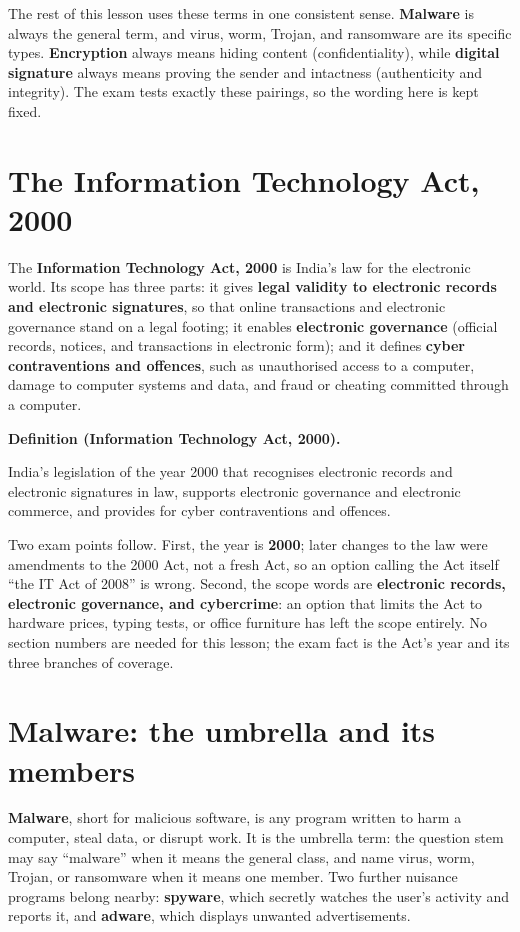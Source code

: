 \documentclass[11pt]{article}
\newenvironment{definitionbox}[1]{%
  \par\noindent\textbf{Definition (#1).}\ \itshape
}{\par\vspace{0.3em}}
\begin{document}
The rest of this lesson uses these terms in one consistent sense.
\textbf{Malware} is always the general term, and virus, worm, Trojan, and
ransomware are its specific types. \textbf{Encryption} always means hiding
content (confidentiality), while \textbf{digital signature} always means
proving the sender and intactness (authenticity and integrity). The exam
tests exactly these pairings, so the wording here is kept fixed.

\section{The Information Technology Act, 2000}
The \textbf{Information Technology Act, 2000} is India's law for the
electronic world. Its scope has three parts: it gives \textbf{legal
validity to electronic records and electronic signatures}, so that online
transactions and electronic governance stand on a legal footing; it enables
\textbf{electronic governance} (official records, notices, and transactions
in electronic form); and it defines \textbf{cyber contraventions and
offences}, such as unauthorised access to a computer, damage to computer
systems and data, and fraud or cheating committed through a computer.

\begin{definitionbox}{Information Technology Act, 2000}
India's legislation of the year 2000 that recognises electronic records
and electronic signatures in law, supports electronic governance and
electronic commerce, and provides for cyber contraventions and offences.
\end{definitionbox}

Two exam points follow. First, the year is \textbf{2000}; later changes to
the law were amendments to the 2000 Act, not a fresh Act, so an option
calling the Act itself ``the IT Act of 2008'' is wrong. Second, the scope
words are \textbf{electronic records, electronic governance, and
cybercrime}: an option that limits the Act to hardware prices, typing
tests, or office furniture has left the scope entirely. No section numbers
are needed for this lesson; the exam fact is the Act's year and its three
branches of coverage.

\section{Malware: the umbrella and its members}
\textbf{Malware}, short for malicious software, is any program written to
harm a computer, steal data, or disrupt work. It is the umbrella term: the
question stem may say ``malware'' when it means the general class, and name
virus, worm, Trojan, or ransomware when it means one member. Two further
nuisance programs belong nearby: \textbf{spyware}, which secretly watches
the user's activity and reports it, and \textbf{adware}, which displays
unwanted advertisements.
\end{document}

